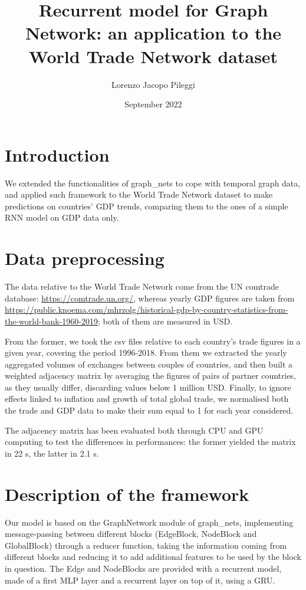 \documentclass{article}
\title{Recurrent model for Graph Network: an application to the World Trade Network dataset}
\author{Lorenzo Jacopo Pileggi}
\date{September 2022}
\begin{document}
\maketitle

\section{Introduction}
We extended the functionalities of graph\_nets to cope with temporal graph data, and applied such framework to the World Trade Network dataset to make predictions on countries' GDP trends, comparing them to the ones of a simple RNN model on GDP data only.

\section{Data preprocessing}
The data relative to the World Trade Network come from the UN comtrade database: \url{https://comtrade.un.org/}, whereas yearly GDP figures are taken from \url{https://public.knoema.com/mhrzolg/historical-gdp-by-country-statistics-from-the-world-bank-1960-2019}; both of them are measured in USD.

From the former, we took the csv files relative to each country's trade figures in a given year, covering the period 1996-2018. From them we extracted the yearly aggregated volumes of exchanges between couples of countries, and then built a weighted adjacency matrix by averaging the figures of pairs of partner countries, as they usually differ, discarding values below 1 million USD. Finally, to ignore effects linked to inflation and growth of total global trade, we normalised both the trade and GDP data to make their sum equal to 1 for each year considered.

The adjacency matrix has been evaluated both through CPU and GPU computing to test the differences in performances: the former yielded the matrix in 22 s, the latter in 2.1 s.

\section{Description of the framework}
Our model is based on the GraphNetwork module of graph\_nets, implementing message-passing between different blocks (EdgeBlock, NodeBlock and GlobalBlock) through a reducer function, taking the information coming from different blocks and reducing it to add additional features to be used by the block in question. The Edge and NodeBlocks are provided with a recurrent model, made of a first MLP layer and a recurrent layer on top of it, using a GRU.
\end{document}
